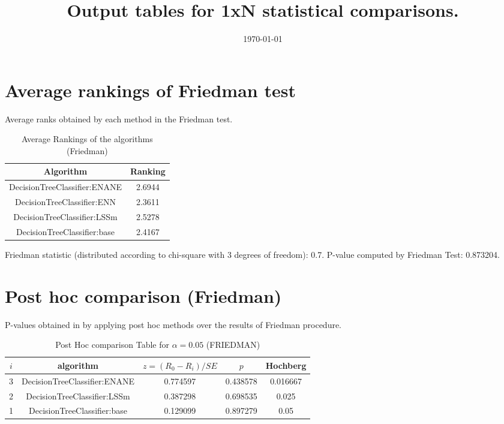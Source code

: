 \documentclass[a4paper,10pt]{article}
\title{Output tables for 1xN statistical comparisons.}
\author{}
\date{\today}
\begin{document}
\begin{landscape}
\pagestyle{empty}
\maketitle
\thispagestyle{empty}

\section{Average rankings of Friedman test}


Average ranks obtained by each method in the Friedman test.

\begin{table}[!htp]
\centering
\begin{tabular}{|c|c|}\hline
Algorithm&Ranking\\\hline
DecisionTreeClassifier:ENANE&2.6944\\DecisionTreeClassifier:ENN&2.3611\\DecisionTreeClassifier:LSSm&2.5278\\DecisionTreeClassifier:base&2.4167\\\hline\end{tabular}
\caption{Average Rankings of the algorithms (Friedman)}
\end{table}

Friedman statistic (distributed according to chi-square with 3 degrees of freedom): 0.7. \newline P-value computed by Friedman Test: 0.873204.\newline


\newpage

\section{Post hoc comparison (Friedman)}


P-values obtained in by applying post hoc methods over the results of Friedman procedure.

\begin{table}[!htp]
\centering\footnotesize
\begin{tabular}{ccccc}
$i$&algorithm&$z=(R_0 - R_i)/SE$&$p$&Hochberg \\
\hline3&DecisionTreeClassifier:ENANE&0.774597&0.438578&0.016667\\2&DecisionTreeClassifier:LSSm&0.387298&0.698535&0.025\\1&DecisionTreeClassifier:base&0.129099&0.897279&0.05\\\hline
\end{tabular}
\caption{Post Hoc comparison Table for $\alpha=0.05$ (FRIEDMAN)}
\end{table}
\newpage


\end{landscape}
\end{document}
